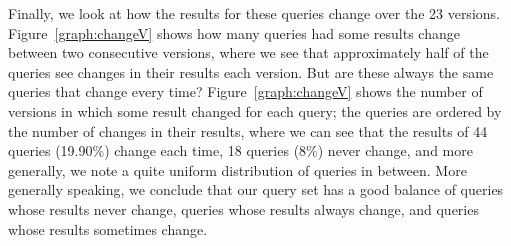 \documentclass[runningheads]{llncs}
\begin{document}
Finally, we look at how the results for these queries change over the 23 versions. Figure~\ref{graph:changeV} shows how many queries had some results change between two consecutive versions, where we see that approximately half of the queries see changes in their results each version. But are these always the same queries that change every time? Figure~\ref{graph:changeV} shows the number of versions in which some result changed for each query; the queries are ordered by the number of changes in their results, where we can see that the results of 44 queries (19.90\%) change each time, 18 queries (8\%) never change, and more generally, we note a quite uniform distribution of queries in between. More generally speaking, we conclude that our query set has a good balance of queries whose results never change, queries whose results always change, and queries whose results sometimes change.
\end{document}
